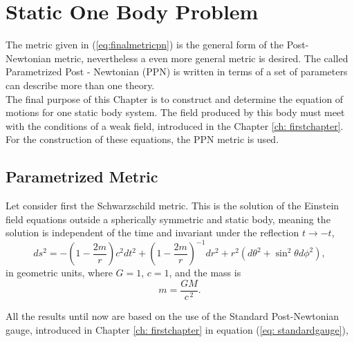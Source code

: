 \chapter{Static One Body Problem}\label{ch:chapter2}


The metric given in (\ref{eq:finalmetricpn}) is the general form of the Post-Newtonian metric, nevertheless a even more general metric is desired. The called Parametrized Post - Newtonian (PPN) is written in terms of a set of parameters can describe more than one theory. \\

The final purpose of this Chapter is to construct and determine the equation of motions for one static body system. The field produced by this body must meet with the conditions of a weak field, introduced in the Chapter \ref{ch: firstchapter}. For the construction of these equations, the PPN metric is used.\\

\section{Parametrized Metric}

Let consider first the Schwarzschild metric. This is the solution of the Einstein field equations outside a spherically symmetric and static body, meaning the solution is independent of the time and invariant under the reflection $t \rightarrow -t$,
\begin{equation}
\label{eq: Schwarzschild metric}
ds^2 = -\left(1-\frac{2m}{r}\right) c^2 dt^2 + \left(1-\frac{2m}{r}\right)^{-1} dr^2 + r^2 (d\theta^2 +\sin^2\theta d\phi^2),
\end{equation}
in geometric units, where $G = 1$, $c = 1$, and the mass is
\begin{equation}
m=\frac{GM}{c^{\,2}}.
\end{equation}



All the results until now are based on the use of the Standard Post-Newtonian gauge, introduced in Chapter \ref{ch: firstchapter} in equation (\ref{eq: standardgauge}),

